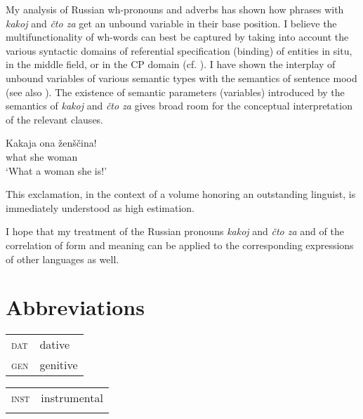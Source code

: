 \documentclass[output=paper,colorlinks,citecolor=brown]{langscibook}
\begin{document}
My analysis of Russian wh-pronouns and adverbs \citep{zi08:Zimmermann2000} has shown how phrases with \textit{kakoj} and \textit{čto za} get an unbound variable in their base position. I believe the multifunctionality of wh-words can best be captured by taking into account the various syntactic domains of referential specification (binding) of entities in situ, in the middle field, or in the CP domain (cf. \citealt{Postma1994,Postma1995}). I have shown the interplay of unbound variables of various semantic types with the semantics of sentence mood (see also \citealt{Zimmermann2009}). The existence of semantic parameters (variables) introduced by the semantics of \textit{kakoj} and \textit{čto za} gives broad room for the conceptual interpretation of the relevant clauses.

\ea \label{ex:zi08:46}
    \gll Kakaja ona ženščina!\\
    what she woman\\
    \glt `What a woman she is!'
\z

\noindent This exclamation, in the context of a volume honoring an outstanding linguist, is immediately understood as high estimation.


I hope that my treatment of the Russian pronouns \textit{kakoj} and \textit{čto za} and of the correlation of form and meaning can be applied to the corresponding expressions of other languages as well.


%

\section*{Abbreviations}

\begin{tabularx}{.5\textwidth}{@{}lX@{}}
\textsc{dat}&{dative}\\
\textsc{gen}&{genitive}\\
\end{tabularx}%
\begin{tabularx}{.5\textwidth}{@{}lX@{}}
\textsc{inst}&{instrumental}\\
&\\ %
\end{tabularx}
\end{document}
